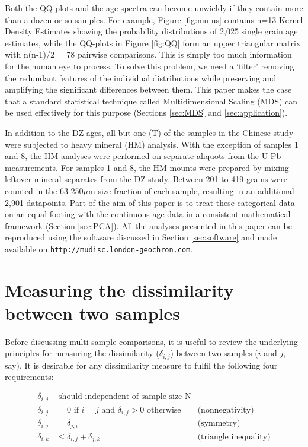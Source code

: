 \documentclass[authoryear,preprint,review,12pt]{elsarticle}
\begin{document}
Both the QQ plots and the age spectra can become unwieldy if they
contain more than a dozen or so samples. For example, Figure
\ref{fig:mu-us} contains n=13 Kernel Density Estimates
\citep[KDEs,][]{vermeesch2012b} showing the probability distributions
of 2,025 single grain age estimates, while the QQ-plots in Figure
\ref{fig:QQ} form an upper triangular matrix with n(n-1)/2 = 78
pairwise comparisons.  This is simply too much information for the
human eye to process. To solve this problem, we need a `filter'
removing the redundant features of the individual distributions while
preserving and amplifying the significant differences between
them. This paper makes the case that a standard statistical technique
called Multidimensional Scaling (MDS) can be used effectively for this
purpose (Sections \ref{sec:MDS} and \ref{sec:application}).  

In addition to the DZ ages, all but one (T) of the samples in the
Chinese study were subjected to heavy mineral (HM) analysis.  With the
exception of samples 1 and 8, the HM analyses were performed on
separate aliquots from the U-Pb measurements. For samples 1 and 8, the
HM mounts were prepared by mixing leftover mineral separates from the
DZ study.  Between 201 to 419 grains were counted in the 63-250$\mu$m
size fraction of each sample, resulting in an additional 2,901
datapoints.  Part of the aim of this paper is to treat these
categorical data on an equal footing with the continuous age data in a
consistent mathematical framework (Section \ref{sec:PCA}). All the
analyses presented in this paper can be reproduced using the software
discussed in Section \ref{sec:software} and made available on
\texttt{http://mudisc.london-geochron.com}.

\section{Measuring the dissimilarity between two samples}
\label{sec:dissimilarity}

Before discussing multi-sample comparisons, it is useful to review the
underlying principles for measuring the dissimilarity ($\delta_{i,j}$)
between two samples ($i$ and $j$, say).  It is desirable for any
dissimilarity measure to fulfil the following four requirements:

\begin{align}
\delta_{i,j} & \mbox{ should independent of sample size N} & \label{eq:samplesize}\\
\delta_{i,j} &= 0 \mbox{ if } i=j \mbox{ and } \delta_{i,j} > 0 \mbox{ otherwise}
& \mbox{(nonnegativity)} \label{eq:nonnegative}\\
\delta_{i,j} &= \delta_{j,i} & \mbox{(symmetry)} \label{eq:symmetric}\\
\delta_{i,k} &\leq \delta_{i,j}  + \delta_{j,k} & \mbox{(triangle inequality)} \label{eq:triangle}
\end{align}
\end{document}
